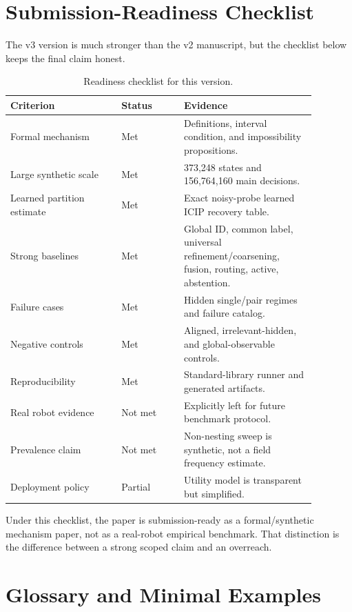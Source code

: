 \documentclass{article}
\newcommand{\icip}{\textsc{ICIP}}
\begin{document}
\section{Submission-Readiness Checklist}

The v3 version is much stronger than the v2 manuscript, but the checklist below keeps the final claim honest.

\begin{table}[h]
\centering
\caption{Readiness checklist for this version.}
\small
\begin{tabular}{p{0.32\linewidth}p{0.18\linewidth}p{0.38\linewidth}}
\toprule
Criterion & Status & Evidence \\
\midrule
Formal mechanism & Met & Definitions, interval condition, and impossibility propositions. \\
Large synthetic scale & Met & 373,248 states and 156,764,160 main decisions. \\
Learned partition estimate & Met & Exact noisy-probe learned \icip{} recovery table. \\
Strong baselines & Met & Global ID, common label, universal refinement/coarsening, fusion, routing, active, abstention. \\
Failure cases & Met & Hidden single/pair regimes and failure catalog. \\
Negative controls & Met & Aligned, irrelevant-hidden, and global-observable controls. \\
Reproducibility & Met & Standard-library runner and generated artifacts. \\
Real robot evidence & Not met & Explicitly left for future benchmark protocol. \\
Prevalence claim & Not met & Non-nesting sweep is synthetic, not a field frequency estimate. \\
Deployment policy & Partial & Utility model is transparent but simplified. \\
\bottomrule
\end{tabular}
\end{table}

Under this checklist, the paper is submission-ready as a formal/synthetic mechanism paper, not as a real-robot empirical benchmark.
That distinction is the difference between a strong scoped claim and an overreach.

\section{Glossary and Minimal Examples}
\end{document}
